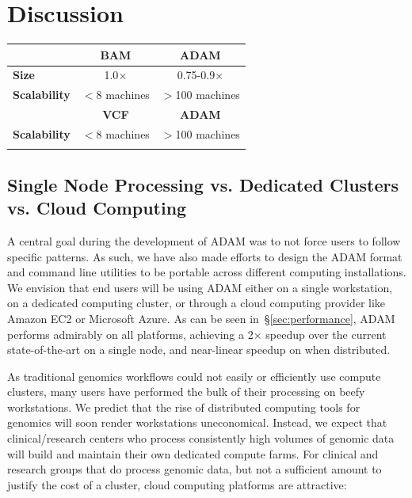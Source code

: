 \documentclass{bioinfo}
\begin{document}
\section{Discussion}
\label{sec:discussion}

\begin{table}[h]
{\begin{tabular}{ l c c }
\toprule
 & \bf BAM & \bf ADAM \\
\midrule
\bf Size & 1.0$\times$ & 0.75-0.9$\times$ \\
\bf Scalability & $<$8 machines & $>$100 machines \\
\midrule
& \bf VCF & \bf ADAM \\
\midrule
\bf Scalability & $<$8 machines & $>$100 machines \\
\botrule
\end{tabular}}{}
\end{table}

\subsection{Single Node Processing vs. Dedicated Clusters vs. Cloud Computing}
\label{sec:single-vs-clusters-vs-cloud}

A central goal during the development of ADAM was to not force users to follow specific patterns. As such, we have also made efforts to design the ADAM format and command
line utilities to be portable across different computing installations. We envision that end users will be using ADAM either on a single workstation, on a dedicated computing
cluster, or through a cloud computing provider like Amazon EC2 or Microsoft Azure. As can be seen in~\S\ref{sec:performance}, ADAM performs admirably on all platforms,
achieving a 2$\times$ speedup over the current state-of-the-art on a single node, and near-linear speedup on when distributed.

As traditional genomics workflows could not easily or efficiently use compute clusters, many users have performed the bulk of their processing on beefy workstations. We predict
that the rise of distributed computing tools for genomics will soon render workstations uneconomical. Instead, we expect that clinical/research centers who process consistently
high volumes of genomic data will build and maintain their own dedicated compute farms. For clinical and research groups that do process genomic data, but not a sufficient
amount to justify the cost of a cluster, cloud computing platforms are attractive:
\end{document}
